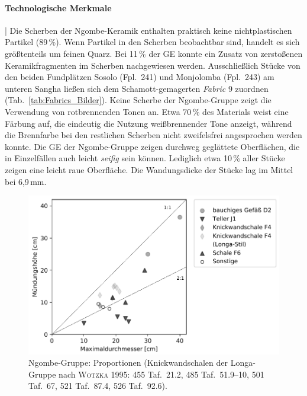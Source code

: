 \paragraph{Technologische Merkmale}\hspace{-.5em}|\hspace{.5em}%
Die Scherben der Ngombe-Keramik enthalten praktisch keine nichtplastischen Partikel (89\,\%). Wenn Partikel in den Scherben beobachtbar sind, handelt es sich größtenteils um feinen Quarz. Bei 11\,\% der GE konnte ein Zusatz von zerstoßenen Keramikfragmenten im Scherben nachgewiesen werden. Ausschließlich Stücke von den beiden Fundplätzen Sosolo (Fpl.~241) und Monjolomba (Fpl.~243) am unteren \mbox{Sangha} ließen sich dem Schamott-gemagerten \textit{Fabric} 9 zuordnen (Tab.~\ref{tab:Fabrics_Bilder}). Keine Scherbe der Ngombe-Gruppe zeigt die Verwendung von rotbrennenden Tonen an. Etwa 70\,\% des Materials weist eine Färbung auf,  die eindeutig die Nutzung weißbrennender Tone anzeigt, während die Brennfarbe bei den restlichen Scherben nicht zweifelsfrei angesprochen werden konnte. Die GE der Ngombe-Gruppe zeigen durchweg geglättete Oberflächen, die in Einzelfällen auch leicht \textit{seifig} sein können. Lediglich etwa 10\,\% aller Stücke zeigen eine leicht raue Oberfläche. Die Wandungsdicke der Stücke lag im Mittel bei 6,9\,mm. 

\begin{figure}[tb!]
	\begin{minipage}[b]{.66\textwidth}
		\includegraphics[width=\textwidth]{fig/NGO_Proportionen.pdf}
	\end{minipage}\hfill
	\begin{minipage}[b]{.33\textwidth}
		\caption{Ngombe-Gruppe: Proportionen (Knickwandschalen der Longa-Gruppe nach \textsc{Wotzka} 1995: 455 Taf.~21.2, 485 Taf.~51.9--10, 501 Taf.~67, 521 Taf.~87.4, 526 Taf.~92.6).\label{fig:NGO_Proportionen}}
	\end{minipage}
\end{figure}

